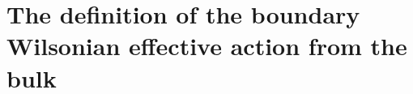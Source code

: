 \documentclass[12pt,epsbox]{article}
\numberwithin{equation}{section}
\begin{document}

\section{The definition of the boundary Wilsonian effective action from the bulk}
\end{document}
